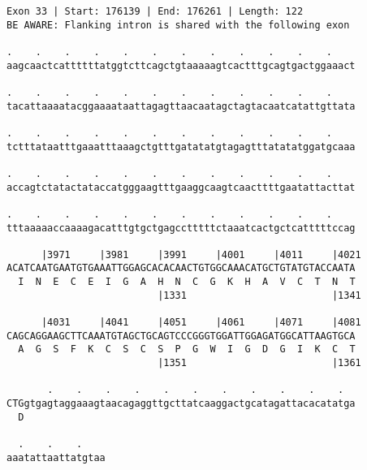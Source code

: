 \documentclass{article}
\begin{document}
\begin{Verbatim}[fontfamily=courier]
Exon 33 | Start: 176139 | End: 176261 | Length: 122
BE AWARE: Flanking intron is shared with the following exon

.    .    .    .    .    .    .    .    .    .    .    .    
aagcaactcattttttatggtcttcagctgtaaaaagtcactttgcagtgactggaaact

.    .    .    .    .    .    .    .    .    .    .    .    
tacattaaaatacggaaaataattagagttaacaatagctagtacaatcatattgttata

.    .    .    .    .    .    .    .    .    .    .    .    
tctttataatttgaaatttaaagctgtttgatatatgtagagtttatatatggatgcaaa

.    .    .    .    .    .    .    .    .    .    .    .    
accagtctatactataccatgggaagtttgaaggcaagtcaacttttgaatattacttat

.    .    .    .    .    .    .    .    .    .    .    .    
tttaaaaaccaaaagacatttgtgctgagcctttttctaaatcactgctcatttttccag

      |3971     |3981     |3991     |4001     |4011     |4021
ACATCAATGAATGTGAAATTGGAGCACACAACTGTGGCAAACATGCTGTATGTACCAATA
  I  N  E  C  E  I  G  A  H  N  C  G  K  H  A  V  C  T  N  T
                          |1331                         |1341

      |4031     |4041     |4051     |4061     |4071     |4081
CAGCAGGAAGCTTCAAATGTAGCTGCAGTCCCGGGTGGATTGGAGATGGCATTAAGTGCA
  A  G  S  F  K  C  S  C  S  P  G  W  I  G  D  G  I  K  C  T
                          |1351                         |1361

       .    .    .    .    .    .    .    .    .    .    .  
CTGgtgagtaggaaagtaacagaggttgcttatcaaggactgcatagattacacatatga
  D                                                         

  .    .    .    
aaatattaattatgtaa
\end{Verbatim}
\newpage
\end{document}
